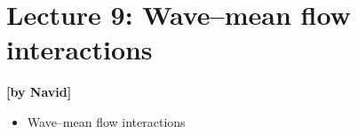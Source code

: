 
\section{Lecture 9: Wave--mean flow interactions}\label{sec:lecture9}
\begin{flushright}\textbf{[by Navid]}\end{flushright}
  
 \begin{itemize}
   \item
   Wave--mean flow interactions
 \end{itemize}
